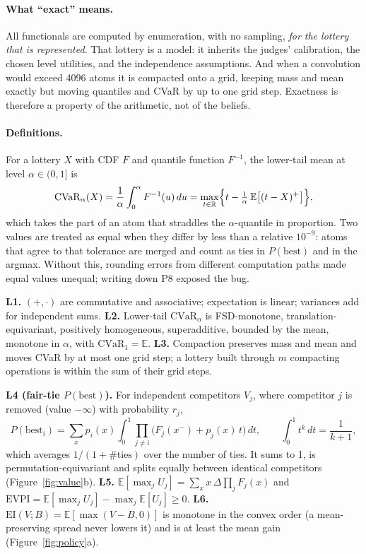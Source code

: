 \documentclass[11pt]{article}
\theoremstyle{definition}
\begin{document}
\paragraph{What ``exact'' means.} All functionals are computed by enumeration, with no sampling,
\emph{for the lottery that is represented}. That lottery is a model: it inherits the judges'
calibration, the chosen level utilities, and the independence assumptions. And when a convolution
would exceed 4096 atoms it is compacted onto a grid, keeping mass and mean exactly but moving
quantiles and CVaR by up to one grid step. Exactness is therefore a property of the arithmetic,
not of the beliefs.

\paragraph{Definitions.} For a lottery $X$ with CDF $F$ and quantile function $F^{-1}$, the
lower-tail mean at level $\alpha\in(0,1]$ is
\begin{equation}
\mathrm{CVaR}_\alpha(X)=\frac1\alpha\int_0^\alpha F^{-1}(u)\,du
=\max_{t\in\mathbb R}\Bigl\{t-\tfrac1\alpha\,\mathbb E\bigl[(t-X)^+\bigr]\Bigr\},
\end{equation}
which takes the part of an atom that straddles the $\alpha$-quantile in proportion. Two values are
treated as equal when they differ by less than a relative $10^{-9}$: atoms that agree to that
tolerance are merged and count as ties in $P(\mathrm{best})$ and in the argmax. Without this, rounding
errors from different computation paths made equal values unequal; writing down P8 exposed the bug.

\textbf{L1.} $(+,\cdot)$ are commutative and associative; expectation is linear; variances add for
independent sums. \textbf{L2.} Lower-tail $\mathrm{CVaR}_\alpha$ is FSD-monotone,
translation-equivariant, positively homogeneous, superadditive, bounded by the mean, monotone in
$\alpha$, with $\mathrm{CVaR}_1=\mathbb{E}$. \textbf{L3.} Compaction preserves mass and mean and
moves CVaR by at most one grid step; a lottery built through $m$ compacting operations is within
the sum of their grid steps.

\textbf{L4 (fair-tie $P(\mathrm{best})$).} For independent competitors $V_j$, where competitor $j$
is removed (value $-\infty$) with probability $r_j$,
\begin{equation}
P(\mathrm{best}_i)
= \sum_x p_i(x)\int_0^1 \prod_{j\neq i}\bigl(F_j(x^-) + p_j(x)\,t\bigr)\,dt ,
\qquad \int_0^1 t^k\,dt = \frac{1}{k+1},
\end{equation}
which averages $1/(1+\#\text{ties})$ over the number of ties. It sums to 1, is
permutation-equivariant and splits equally between identical competitors
(Figure~\ref{fig:value}b). \textbf{L5.}
$\mathbb{E}[\max_j U_j]=\sum_x x\,\Delta\prod_j F_j(x)$ and $\mathrm{EVPI}=\mathbb{E}[\max_j
U_j]-\max_j\mathbb{E}[U_j]\ge 0$. \textbf{L6.} $\mathrm{EI}(V;B)=\mathbb{E}[\max(V-B,0)]$ is
monotone in the convex order (a mean-preserving spread never lowers it) and is at least the mean
gain (Figure~\ref{fig:policy}a).
\end{document}
